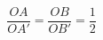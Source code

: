 \documentclass[preview]{standalone}
\begin{document}
\begin{center}
$$\frac{OA}{OA'}=\frac{OB}{OB'}=\frac{1}{2}$$
\end{center}
\end{document}
